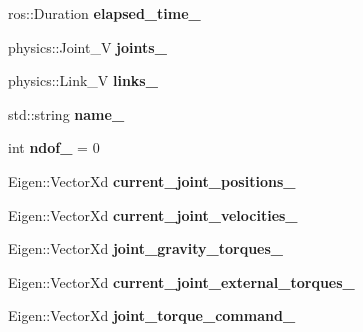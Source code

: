 \begin{DoxyCompactItemize}
ros\+::\+Duration {\bfseries elapsed\+\_\+time\+\_\+}
\item 
\mbox{\label{classgazebo_1_1_panda_simulation_a1ceb842453aa9714366432134bbd0941}} 
physics\+::\+Joint\+\_\+V {\bfseries joints\+\_\+}
\item 
\mbox{\label{classgazebo_1_1_panda_simulation_a40684c917baf05e392e38a3bc6046552}} 
physics\+::\+Link\+\_\+V {\bfseries links\+\_\+}
\item 
\mbox{\label{classgazebo_1_1_panda_simulation_a471c574062e04e6fe9fa38f1df934308}} 
std\+::string {\bfseries name\+\_\+}
\item 
\mbox{\label{classgazebo_1_1_panda_simulation_a2b22a3074d11024290c1a7906f9ca954}} 
int {\bfseries ndof\+\_\+} = 0
\item 
\mbox{\label{classgazebo_1_1_panda_simulation_a58b09cb4e1249e6f677a625f890c429a}} 
Eigen\+::\+Vector\+Xd {\bfseries current\+\_\+joint\+\_\+positions\+\_\+}
\item 
\mbox{\label{classgazebo_1_1_panda_simulation_a0ec51844867731f643b09193ab631ab8}} 
Eigen\+::\+Vector\+Xd {\bfseries current\+\_\+joint\+\_\+velocities\+\_\+}
\item 
\mbox{\label{classgazebo_1_1_panda_simulation_a9e864ba4666585ecece910b8e217f9f8}} 
Eigen\+::\+Vector\+Xd {\bfseries joint\+\_\+gravity\+\_\+torques\+\_\+}
\item 
\mbox{\label{classgazebo_1_1_panda_simulation_a74167069fd53ea672b39d7d9b96d18e1}} 
Eigen\+::\+Vector\+Xd {\bfseries current\+\_\+joint\+\_\+external\+\_\+torques\+\_\+}
\item 
\mbox{\label{classgazebo_1_1_panda_simulation_a76bbdab784df342f7042aa9bd49c2310}} 
Eigen\+::\+Vector\+Xd {\bfseries joint\+\_\+torque\+\_\+command\+\_\+}
\item 
\mbox{\label{classgazebo_1_1_panda_simulation_a8f26d9d2d1060a9ebf6841bf0f5eac5f}} 

\end{DoxyCompactItemize}
